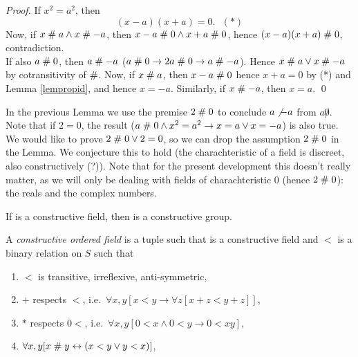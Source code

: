 \begin{proof}
If $x^2 = a^2$, then 
$$(x-a)(x+a) = 0.\:\:\: (*)$$ 
Now, if $x\mathrel{\#} a \wedge x\mathrel{\#}
-a$, then $x-a \mathrel{\#} 0 \wedge x+a\mathrel{\#} 0$, hence $(x-a)(x+a) \mathrel{\#} 0$,
contradiction.\\
If also $a\mathrel{\#} 0$, then $a\mathrel{\#} -a$ ($a\mathrel{\#} 0 \rightarrow 2a\mathrel{\#} 0
\rightarrow a\mathrel{\#} -a$). Hence $x\mathrel{\#} a \vee x\mathrel{\#} -a$ by
cotransitivity of $\mathrel{\#}$. Now, if $x\mathrel{\#} a$, then $x-a \mathrel{\#} 0$
hence $x+a = 0$ by (*) and Lemma \ref{lempropid}, and hence
$x=-a$. Similarly, if $x\mathrel{\#} -a$, then $x = a$.
\qed
\end{proof}

\begin{remark}
In the previous Lemma we use the premise $2\mathrel{\#} 0$ to conclude $a\not
-a$ from $a \not 0$. Note that if $2=0$, the result ($a\mathrel{\#} 0\wedge
x^2 = a^2 \rightarrow x= a \vee x= -a$) is also true. We would like to
prove $2\mathrel{\#} 0 \vee 2 = 0$, so we can drop the assumption $2\mathrel{\#} 0$
in the Lemma. We conjecture this to hold (the charachteristic of a
field is discreet, also constructively (?)). Note that for the present
development this doesn't really matter, as we will only be dealing
with fields of charachteristic $0$ (hence $2\mathrel{\#} 0$): the reals and
the complex numbers.
\end{remark}

\begin{lemma}\label{lemfdmulgrp}
If  is a
constructive field, then 
is a constructive group.
\end{lemma}

\begin{definition}\label{defordfield}
A {\em constructive ordered field\/} is a tuple
 such that
 is a constructive field and $<$ is a
binary relation on $S$ such that
\begin{enumerate}
\item $<$ is transitive, irreflexive, anti-symmetric,
\item $+$ respects $<$, i.e.\ $\forall x,y [x<y \rightarrow\forall
z[x+z<y+z]]$,
\item $*$ respects $0<$, i.e.\ $\forall x,y [0<x \wedge 0<y
\rightarrow 0< x y]$,
\item $\forall x,y[ x \mathrel{\#} y  \leftrightarrow  (x < y \vee y< x)]$,   
\end{enumerate}
\end{definition}



